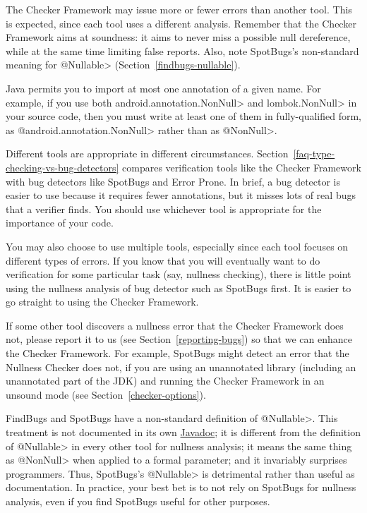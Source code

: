 The Checker Framework may issue more or fewer errors than another tool.
This is expected, since each tool uses a different analysis.  Remember that
the Checker Framework aims at soundness:  it aims to never miss a possible
null dereference, while at the same time limiting false reports.  Also,
note SpotBugs's non-standard meaning for \<@Nullable>
(Section~\ref{findbugs-nullable}).

Java permits you to import at most one annotation of a given name.  For
example, if you use both \<android.annotation.NonNull> and
\<lombok.NonNull> in your source code, then you must write at least one of
them in fully-qualified form, as \<@android.annotation.NonNull> rather than
as \<@NonNull>.



Different tools are appropriate in different circumstances.
Section~\ref{faq-type-checking-vs-bug-detectors} compares verification
tools like the Checker Framework with bug detectors like SpotBugs and Error
Prone.  In brief, a bug detector is easier to use because it requires fewer
annotations, but it misses lots of real bugs that a verifier finds.  You
should use whichever tool is appropriate for the importance of your code.

You may also choose to use multiple tools, especially since each tool
focuses on different types of errors.  If you know that you will eventually
want to do verification for some particular task (say, nullness checking),
there is little point using the nullness analysis of bug detector such as
SpotBugs first.  It is easier to go straight to using the
Checker Framework.

If some other tool discovers a nullness error that the Checker
Framework does not, please report it to us (see
Section~\ref{reporting-bugs}) so that we can enhance the Checker Framework.
For example, SpotBugs might detect an error that the Nullness Checker does
not, if you are using an unannotated library (including an unannotated
part of the JDK) and running the Checker Framework in an unsound mode (see
Section~\ref{checker-options}).



FindBugs and SpotBugs have a non-standard definition of
\<@Nullable>.  This treatment is not documented in its own
\href{https://www.javadoc.io/doc/com.github.spotbugs/spotbugs-annotations/latest/edu/umd/cs/findbugs/annotations/Nullable.html}{Javadoc};
it is different from the definition of \<@Nullable> in every other tool for
nullness analysis; it means the same thing as \<@NonNull> when applied to a
formal parameter; and it invariably surprises programmers.  Thus, SpotBugs's
\<@Nullable> is detrimental rather than useful as documentation.
In practice, your best bet is to not rely on SpotBugs for nullness analysis,
even if you find SpotBugs useful for other purposes.

